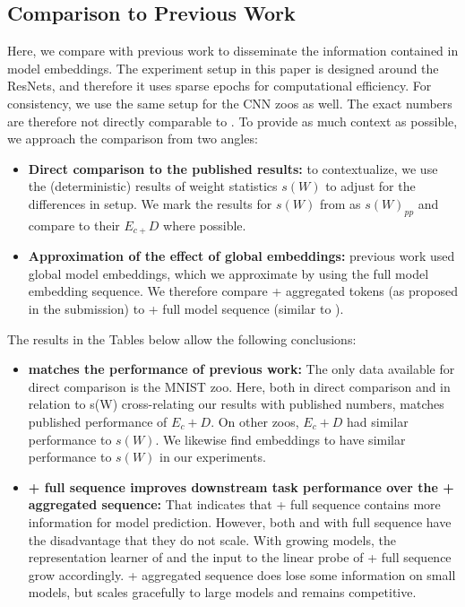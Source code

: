 \subsection{Comparison to Previous Work}
\label{app:discr_comparison_previous_work}
Here, we compare \ourmethod with previous work to disseminate the information contained in model embeddings.
The experiment setup in this paper is designed around the ResNets, and therefore it uses sparse epochs for computational efficiency. For consistency, we use the same setup for the CNN zoos as well. The exact numbers are therefore not directly comparable to \citet{schurholtSelfSupervisedRepresentationLearning2021}.   
To provide as much context as possible, we approach the comparison from two angles:
\begin{itemize}
    \item [(1)]\textbf{Direct comparison to the published results:} to contextualize, we use the (deterministic) results of weight statistics $s(W)$ to adjust for the differences in setup. We mark the results for $s(W)$ from \citet{schurholtSelfSupervisedRepresentationLearning2021} as $s(W)_{pp}$ and compare to their $E_{c+}D$ where possible.
    \item [(2)] \textbf{Approximation of the effect of global embeddings:} previous work used global model embeddings, which we approximate by using the full model embedding sequence. We therefore compare \ourmethod + aggregated tokens (as proposed in the submission) to \ourmethod + full model sequence (similar to \citet{schurholtSelfSupervisedRepresentationLearning2021}).
\end{itemize}

The results in the Tables below allow the following conclusions:
\begin{itemize}
    \item [(1)] \textbf{\ourmethod matches the performance of previous work:} The only data available for direct comparison is the MNIST zoo. Here, both in direct comparison and in relation to s(W) cross-relating our results with published numbers, \ourmethod matches published performance of $E_c+D$. On other zoos, $E_c+D$ had similar performance to $s(W)$. We likewise find \ourmethod embeddings to have similar performance to $s(W)$ in our experiments.
    \item [(2)] \textbf{\ourmethod + full sequence improves downstream task performance over the \ourmethod + aggregated sequence:} That indicates that \ourmethod + full sequence contains more information for model prediction. However, both \citet{schurholtSelfSupervisedRepresentationLearning2021} and \ourmethod with full sequence have the disadvantage that they do not scale. With growing models, the representation learner of \citet{schurholtSelfSupervisedRepresentationLearning2021} and the input to the linear probe of \ourmethod + full sequence grow accordingly. \ourmethod + aggregated sequence does lose some information on small models, but scales gracefully to large models and remains competitive.
\end{itemize}

